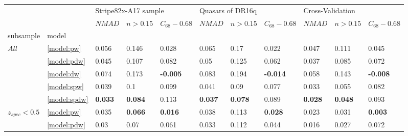 \documentclass[fleqn,usenatbib]{mnras}
\begin{document}
\begin{table}
	\begin{tabular}{lllllllllll}
            \hline
                                   &                  & \multicolumn{3}{l}{Stripe82x-A17 sample} & \multicolumn{3}{l}{Quasars of DR16q} & \multicolumn{3}{l}{Cross-Validation} \\
                                   &                  &               $NMAD$ &        $n>0.15$ &  $C_{68} - 0.68$ &           $NMAD$ &        $n>0.15$ &  $C_{68} - 0.68$ &           $NMAD$ &        $n>0.15$ &  $C_{68} - 0.68$ \\
            subsample & model &                      &                 &                  &                  &                 &                  &                  &                 &                  \\
            \hline
\hline
            $All$ & \ref{model:pw} &                0.056 &           0.146 &            0.028 &            0.065 &            0.17 &            0.022 &            0.047 &           0.111 &            0.045 \\
                                   & \ref{model:pdw} &                0.045 &           0.107 &            0.082 &             0.05 &           0.125 &            0.062 &            0.037 &           0.085 &            0.072 \\
                                   & \ref{model:dw} &                0.074 &           0.173 &  \textbf{-0.005} &            0.083 &           0.194 &  \textbf{-0.014} &            0.058 &           0.143 &  \textbf{-0.008} \\
                                   & \ref{model:spw} &                0.039 &             0.1 &            0.099 &            0.041 &            0.09 &            0.077 &            0.033 &           0.055 &            0.082 \\
                                   & \ref{model:spdw} &       \textbf{0.033} &  \textbf{0.084} &            0.113 &   \textbf{0.037} &  \textbf{0.078} &            0.089 &   \textbf{0.028} &  \textbf{0.048} &            0.093 \\
\hline
            $z_{spec} < 0.5$ & \ref{model:pw} &                0.035 &  \textbf{0.066} &   \textbf{0.016} &            0.038 &           0.113 &   \textbf{0.028} &            0.023 &           0.031 &   \textbf{0.003} \\
                                   & \ref{model:pdw} &                 0.03 &            0.07 &            0.061 &            0.033 &           0.112 &            0.044 &            0.016 &           0.027 &            0.072 \\

\end{tabular}
\end{table}
\end{document}
